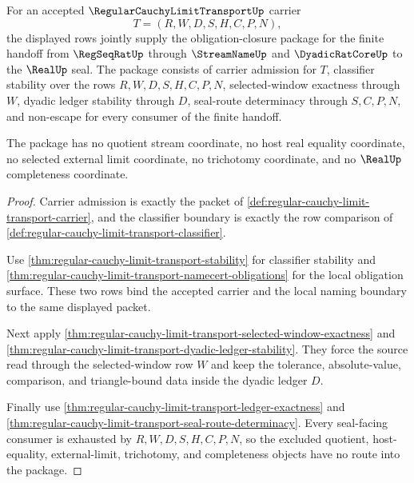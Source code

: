 \begin{theorem}
\label{thm:regular-cauchy-limit-transport-obligation-closure-package}
For an accepted $\RegularCauchyLimitTransportUp$ carrier
$$
T=(R,W,D,S,H,C,P,N),
$$
the displayed rows jointly supply the obligation-closure package for the finite handoff from $\RegSeqRatUp$ through $\StreamNameUp$ and $\DyadicRatCoreUp$ to the $\RealUp$ seal. The package consists of carrier admission for $T$, classifier stability over the rows $R,W,D,S,H,C,P,N$, selected-window exactness through $W$, dyadic ledger stability through $D$, seal-route determinacy through $S,C,P,N$, and non-escape for every consumer of the finite handoff.

The package has no quotient stream coordinate, no host real equality coordinate, no selected external limit coordinate, no trichotomy coordinate, and no $\RealUp$ completeness coordinate.
\end{theorem}
\begin{proof}
Carrier admission is exactly the packet of \autoref{def:regular-cauchy-limit-transport-carrier}, and the classifier boundary is exactly the row comparison of \autoref{def:regular-cauchy-limit-transport-classifier}.

Use \autoref{thm:regular-cauchy-limit-transport-stability} for classifier stability and \autoref{thm:regular-cauchy-limit-transport-namecert-obligations} for the local obligation surface. These two rows bind the accepted carrier and the local naming boundary to the same displayed packet.

Next apply \autoref{thm:regular-cauchy-limit-transport-selected-window-exactness} and \autoref{thm:regular-cauchy-limit-transport-dyadic-ledger-stability}. They force the source read through the selected-window row $W$ and keep the tolerance, absolute-value, comparison, and triangle-bound data inside the dyadic ledger $D$.

Finally use \autoref{thm:regular-cauchy-limit-transport-ledger-exactness} and \autoref{thm:regular-cauchy-limit-transport-seal-route-determinacy}. Every seal-facing consumer is exhausted by $R,W,D,S,H,C,P,N$, so the excluded quotient, host-equality, external-limit, trichotomy, and completeness objects have no route into the package.
\end{proof}

